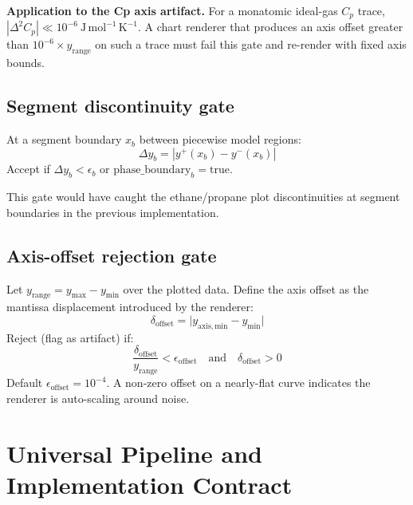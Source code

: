 \documentclass[11pt, a4paper, oneside]{article}
\begin{document}
\noindent\textbf{Application to the Cp axis artifact.} For a monatomic
ideal-gas $C_p$ trace, $|\Delta^2 C_p| \ll 10^{-6}\ \mathrm{J\,mol^{-1}\,K^{-1}}$.
A chart renderer that produces an axis offset greater than
$10^{-6} \times y_{\mathrm{range}}$ on such a trace must fail this gate and
re-render with fixed axis bounds.

\subsection{Segment discontinuity gate}

At a segment boundary $x_b$ between piecewise model regions:
\begin{equation}
  \Delta y_b = \left| y^+(x_b) - y^-(x_b) \right|
  \label{eq:val_disc}
\end{equation}
Accept if $\Delta y_b < \epsilon_b$ or $\mathrm{phase\_boundary}_b =
\mathrm{true}$.

\noindent This gate would have caught the ethane/propane plot discontinuities
at segment boundaries in the previous implementation.

\subsection{Axis-offset rejection gate}

Let $y_{\mathrm{range}} = y_{\max} - y_{\min}$ over the plotted data. Define
the axis offset as the mantissa displacement introduced by the renderer:
\begin{equation}
  \delta_{\mathrm{offset}} = \bigl|y_{\mathrm{axis,min}} - y_{\min}\bigr|
  \label{eq:val_offset}
\end{equation}
Reject (flag as artifact) if:
\begin{equation}
  \frac{\delta_{\mathrm{offset}}}{y_{\mathrm{range}}} < \epsilon_{\mathrm{offset}}
  \quad \text{and} \quad
  \delta_{\mathrm{offset}} > 0
  \label{eq:val_offset_gate}
\end{equation}
Default $\epsilon_{\mathrm{offset}} = 10^{-4}$. A non-zero offset on a
nearly-flat curve indicates the renderer is auto-scaling around noise.

\section{Universal Pipeline and Implementation Contract}
\label{sec:contract}
\end{document}
